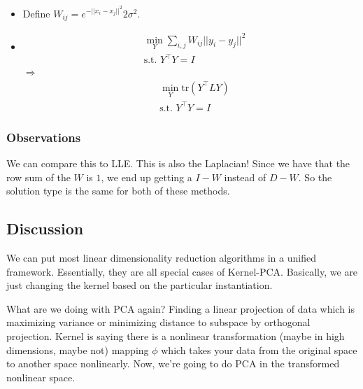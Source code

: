 \begin{itemize}
\item Define $W_{ij}=e^{-||x_i-x_j||^2}{2\sigma^2}$.
\item 
\begin{align*}
&\min_{Y} \sum_{i,j} W_{ij} ||y_i-y_j||^2\\
&\text{s.t. } Y^\intercal Y=I
\end{align*}
$\Rightarrow$
\begin{align*}
&\min_{Y} \text{tr} (Y^\intercal LY)\\
&\text{s.t. } Y^\intercal Y=I
\end{align*}
\end{itemize}
\subsubsection*{Observations}
We can compare this to LLE. This is also the Laplacian! Since we have that the row sum of the $W$ is $1$, we end up getting a $I - W$ instead of $D - W$. So the solution type is the same for both of these methods.

\subsection*{Discussion}
We can put most linear dimensionality reduction algorithms in a unified framework. Essentially, they are all special cases of Kernel-PCA. Basically, we are just changing the kernel based on the particular instantiation. 

What are we doing with PCA again? Finding a linear projection of data which is maximizing variance or minimizing distance to subspace by orthogonal projection. Kernel is saying there is a nonlinear transformation (maybe in high dimensions, maybe not) mapping $\phi$ which takes your data from the original space to another space nonlinearly. Now, we're going to do PCA in the transformed nonlinear space. 

